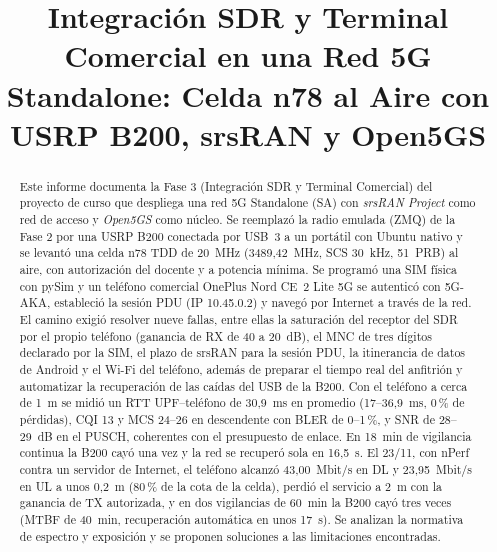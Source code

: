 \documentclass[conference]{IEEEtran}
\begin{document}
\title{Integración SDR y Terminal Comercial en una Red 5G Standalone: Celda n78 al Aire con USRP B200, srsRAN y Open5GS}

\author{
}

\maketitle

\begin{abstract}
Este informe documenta la Fase 3 (Integración SDR y Terminal Comercial) del proyecto de curso que despliega una red 5G Standalone (SA) con \textit{srsRAN Project} como red de acceso y \textit{Open5GS} como núcleo. Se reemplazó la radio emulada (ZMQ) de la Fase 2 por una USRP B200 conectada por USB~3 a un portátil con Ubuntu nativo y se levantó una celda n78 TDD de 20~MHz (3489{,}42~MHz, SCS 30~kHz, 51~PRB) al aire, con autorización del docente y a potencia mínima. Se programó una SIM física con pySim y un teléfono comercial OnePlus Nord CE~2 Lite 5G se autenticó con 5G-AKA, estableció la sesión PDU (IP 10.45.0.2) y navegó por Internet a través de la red. El camino exigió resolver nueve fallas, entre ellas la saturación del receptor del SDR por el propio teléfono (ganancia de RX de 40 a 20~dB), el MNC de tres dígitos declarado por la SIM, el plazo de srsRAN para la sesión PDU, la itinerancia de datos de Android y el Wi-Fi del teléfono, además de preparar el tiempo real del anfitrión y automatizar la recuperación de las caídas del USB de la B200. Con el teléfono a cerca de 1~m se midió un RTT UPF--teléfono de 30{,}9~ms en promedio (17--36{,}9~ms, 0\,\% de pérdidas), CQI 13 y MCS 24--26 en descendente con BLER de 0--1\,\%, y SNR de 28--29~dB en el PUSCH, coherentes con el presupuesto de enlace. En 18~min de vigilancia continua la B200 cayó una vez y la red se recuperó sola en 16{,}5~s. El 23/11, con nPerf contra un servidor de Internet, el teléfono alcanzó 43{,}00~Mbit/s en DL y 23{,}95~Mbit/s en UL a unos 0{,}2~m (80\,\% de la cota de la celda), perdió el servicio a 2~m con la ganancia de TX autorizada, y en dos vigilancias de 60~min la B200 cayó tres veces (MTBF de 40~min, recuperación automática en unos 17~s). Se analizan la normativa de espectro y exposición y se proponen soluciones a las limitaciones encontradas.
\end{abstract}
\end{document}
